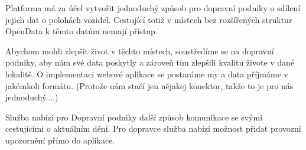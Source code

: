 Platforma má za účel vytvořit jednoduchý způsob pro dopravní podniky o sdílení jejich dat o polohách vozidel.
Cestující totiž v místech bez rozšířených struktur OpenData k těmto datům nemají přístup.

Abychom mohli zlepšit život v těchto místech, soustředíme se na dopravní podniky, aby nám své data poskytly a zároveň tím zlepšili kvalitu živote v dané lokalitě.
O implementaci webové aplikace se postaráme my a data příjmáme v jakémkoli formátu. (Protože nám stačí jen nějakej konektor, takže to je pro nás jednoduchý....)

Služba nabízí pro Dopravní podniky další způsob komunikace se svými cestujícími o aktuálním dění. Pro dopravce služba nabízí možnost přidat provozní upozornění přímo do aplikace.



